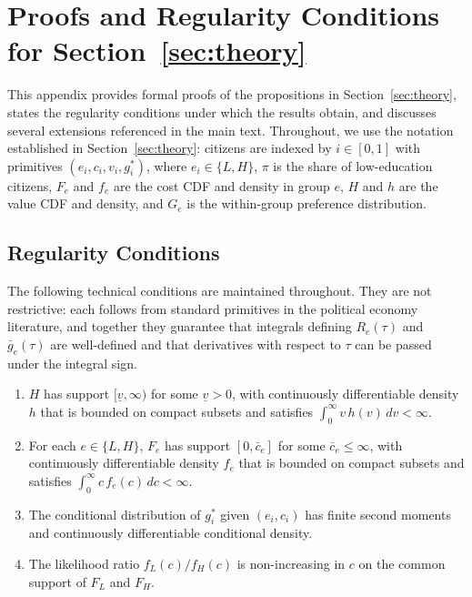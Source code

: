 \section{Proofs and Regularity Conditions for Section~\ref{sec:theory}}
\label{sec:theory_proofs}

This appendix provides formal proofs of the propositions in Section~\ref{sec:theory}, states the regularity conditions under which the results obtain, and discusses several extensions referenced in the main text. Throughout, we use the notation established in Section~\ref{sec:theory}: citizens are indexed by $i \in [0, 1]$ with primitives $(e_i, c_i, v_i, g_i^*)$, where $e_i \in \{L, H\}$, $\pi$ is the share of low-education citizens, $F_e$ and $f_e$ are the cost CDF and density in group $e$, $H$ and $h$ are the value CDF and density, and $G_e$ is the within-group preference distribution.

\subsection{Regularity Conditions}
\label{ssec:proofs_regularity}

The following technical conditions are maintained throughout. They are not restrictive: each follows from standard primitives in the political economy literature, and together they guarantee that integrals defining $R_e(\tau)$ and $\bar g_e(\tau)$ are well-defined and that derivatives with respect to $\tau$ can be passed under the integral sign.

\begin{regularitycondition}
\label{cond:regularity}
\begin{enumerate}
    \item[(a)] $H$ has support $[\underline v, \infty)$ for some $\underline v > 0$, with continuously differentiable density $h$ that is bounded on compact subsets and satisfies $\int_0^\infty v \, h(v)\, dv < \infty$.
    \item[(b)] For each $e \in \{L, H\}$, $F_e$ has support $[0, \bar c_e]$ for some $\bar c_e \leq \infty$, with continuously differentiable density $f_e$ that is bounded on compact subsets and satisfies $\int_0^\infty c \, f_e(c) \, dc < \infty$.
    \item[(c)] The conditional distribution of $g_i^*$ given $(e_i, c_i)$ has finite second moments and continuously differentiable conditional density.
    \item[(d)] The likelihood ratio $f_L(c)/f_H(c)$ is non-increasing in $c$ on the common support of $F_L$ and $F_H$.
\end{enumerate}
\end{regularitycondition}


